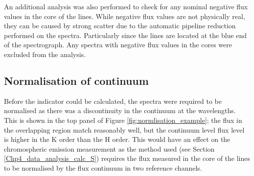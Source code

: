 An additional analysis was also performed to check for any nominal negative flux values in the core of the \caII lines. While negative flux values are not physically real, they can be caused by strong scatter due to the automatic pipeline reduction performed on the spectra. Particularly since the \caII lines are located at the blue end of the spectrograph. Any spectra with negative flux values in the \caII cores were excluded from the analysis.

\subsection{Normalisation of continuum}
\label{Chp4_data_analysis_normalise_cont}
Before the \Rprime indicator could be calculated, the spectra were required to be normalised as there was a discontinuity in the continuum at the \caII wavelengths. This is shown in the top panel of Figure \ref{fig:normlisation_example}; the flux in the overlapping region match reasonably well, but the continuum level flux level is higher in the K order than the H order. This would have an effect on the chromospheric emission measurement as the method used (see Section \ref{Chp4_data_analysis_calc_S}) requires the flux measured in the core of the \caII lines to be normalised by the flux continuum in two reference channels.

